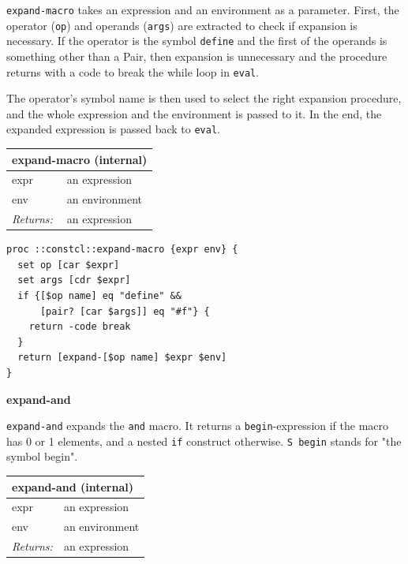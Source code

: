 \documentclass[twoside,9pt]{report}
\begin{document}
\texttt{expand-macro} takes an expression and an environment as a parameter. First, the operator (\texttt{op}) and operands (\texttt{args}) are extracted to check if expansion is necessary. If the operator is the symbol \texttt{define} and the first of the operands is something other than a Pair, then expansion is unnecessary and the procedure returns with a code to break the while loop in \texttt{eval}.


The operator's symbol name is then used to select the right expansion procedure, and the whole expression and the environment is passed to it. In the end, the expanded expression is passed back to \texttt{eval}.

\begin{tabular}{ |l l| }
\hline
\multicolumn{2}{|l|}{expand-macro (internal)} \\
\hline
expr & an expression \\
env & an environment \\
\textit{Returns:} & an expression \\
\hline
\end{tabular}

\noindent\makebox[\linewidth]{\rule{\linewidth}{0.4pt}}
\begin{lstlisting}
proc ::constcl::expand-macro {expr env} {
  set op [car $expr]
  set args [cdr $expr]
  if {[$op name] eq "define" &&
      [pair? [car $args]] eq "#f"} {
    return -code break
  }
  return [expand-[$op name] $expr $env]
}
\end{lstlisting}
\noindent\makebox[\linewidth]{\rule{\linewidth}{0.4pt}}

\textbf{expand-and}


\texttt{expand-and} expands the \texttt{and} macro. It returns a \texttt{begin}-expression if the macro has 0 or 1 elements, and a nested \texttt{if} construct otherwise. \texttt{S begin} stands for "the symbol begin".

\begin{tabular}{ |l l| }
\hline
\multicolumn{2}{|l|}{expand-and (internal)} \\
\hline
expr & an expression \\
env & an environment \\
\textit{Returns:} & an expression \\
\hline
\end{tabular}
\end{document}
